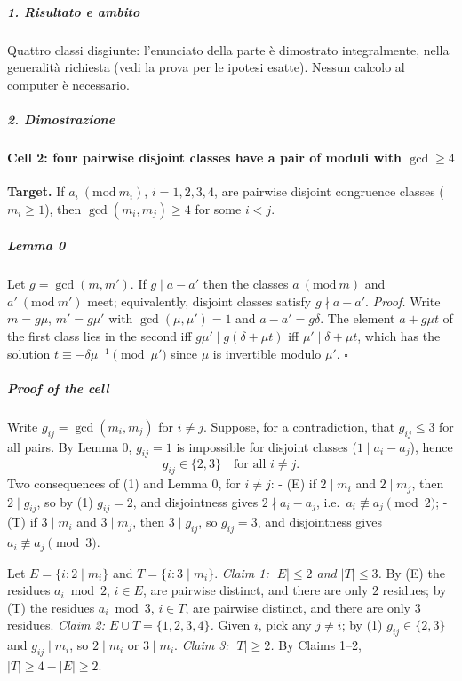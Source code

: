 \documentclass[11pt,a4paper]{article}
\begin{document}
\subparagraph{1. Risultato e ambito}\label{risultato-e-ambito}

Quattro classi disgiunte: l'enunciato della parte è dimostrato
integralmente, nella generalità richiesta (vedi la prova per le ipotesi
esatte). Nessun calcolo al computer è necessario.

\subparagraph{2. Dimostrazione}\label{dimostrazione}

\paragraph{\texorpdfstring{Cell 2: four pairwise disjoint classes have a
pair of moduli with
\(\gcd\ge4\)}{Cell 2: four pairwise disjoint classes have a pair of moduli with \textbackslash gcd\textbackslash ge4}}\label{cell-2-four-pairwise-disjoint-classes-have-a-pair-of-moduli-with-gcdge4}

\textbf{Target.} If \(a_i\ (\mathrm{mod}\ m_i)\), \(i=1,2,3,4\), are
pairwise disjoint congruence classes (\(m_i\ge1\)), then
\(\gcd(m_i,m_j)\ge4\) for some \(i<j\).

\subparagraph{Lemma 0}\label{lemma-0}

Let \(g=\gcd(m,m')\). If \(g\mid a-a'\) then the classes
\(a\ (\mathrm{mod}\ m)\) and \(a'\ (\mathrm{mod}\ m')\) meet;
equivalently, disjoint classes satisfy \(g\nmid a-a'\). \emph{Proof.}
Write \(m=g\mu\), \(m'=g\mu'\) with \(\gcd(\mu,\mu')=1\) and
\(a-a'=g\delta\). The element \(a+g\mu t\) of the first class lies in
the second iff \(g\mu'\mid g(\delta+\mu t)\) iff
\(\mu'\mid\delta+\mu t\), which has the solution
\(t\equiv-\delta\mu^{-1}\pmod{\mu'}\) since \(\mu\) is invertible modulo
\(\mu'\). \(\square\)

\subparagraph{Proof of the cell}\label{proof-of-the-cell}

Write \(g_{ij}=\gcd(m_i,m_j)\) for \(i\ne j\). Suppose, for a
contradiction, that \(g_{ij}\le3\) for all pairs. By Lemma 0,
\(g_{ij}=1\) is impossible for disjoint classes (\(1\mid a_i-a_j\)),
hence \[g_{ij}\in\{2,3\}\quad\text{for all } i\ne j.\tag{1}\] Two
consequences of (1) and Lemma 0, for \(i\ne j\): - (E) if \(2\mid m_i\)
and \(2\mid m_j\), then \(2\mid g_{ij}\), so by (1) \(g_{ij}=2\), and
disjointness gives \(2\nmid a_i-a_j\), i.e.~\(a_i\not\equiv a_j\pmod2\);
- (T) if \(3\mid m_i\) and \(3\mid m_j\), then \(3\mid g_{ij}\), so
\(g_{ij}=3\), and disjointness gives \(a_i\not\equiv a_j\pmod3\).

Let \(E=\{i: 2\mid m_i\}\) and \(T=\{i:3\mid m_i\}\). \emph{Claim 1:
\(|E|\le2\) and \(|T|\le3\).} By (E) the residues \(a_i\bmod2\),
\(i\in E\), are pairwise distinct, and there are only \(2\) residues; by
(T) the residues \(a_i\bmod3\), \(i\in T\), are pairwise distinct, and
there are only \(3\) residues. \emph{Claim 2: \(E\cup T=\{1,2,3,4\}\).}
Given \(i\), pick any \(j\ne i\); by (1) \(g_{ij}\in\{2,3\}\) and
\(g_{ij}\mid m_i\), so \(2\mid m_i\) or \(3\mid m_i\). \emph{Claim 3:
\(|T|\ge2\).} By Claims 1--2, \(|T|\ge4-|E|\ge2\).
\end{document}
